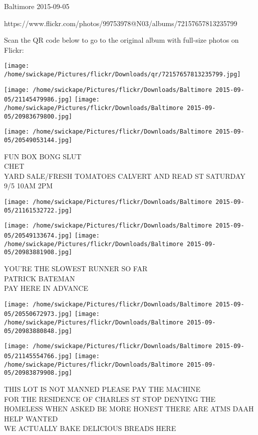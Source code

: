 \documentclass[10pt,letterpaper]{article}
\begin{document}
Baltimore 2015-09-05

https://www.flickr.com/photos/99753978@N03/albums/72157657813235799

Scan the QR code below to go to the original album with full-size photos on Flickr:

\texttt{[image: /home/swickape/Pictures/flickr/Downloads/qr/72157657813235799.jpg]}
\pagebreak

\texttt{[image: /home/swickape/Pictures/flickr/Downloads/Baltimore 2015-09-05/21145479986.jpg]}
\texttt{[image: /home/swickape/Pictures/flickr/Downloads/Baltimore 2015-09-05/20983679800.jpg]}

\texttt{[image: /home/swickape/Pictures/flickr/Downloads/Baltimore 2015-09-05/20549053144.jpg]}

FUN BOX BONG SLUT\\
CHET\\
YARD SALE/FRESH TOMATOES CALVERT AND READ ST SATURDAY 9/5 10AM 2PM
\pagebreak

\texttt{[image: /home/swickape/Pictures/flickr/Downloads/Baltimore 2015-09-05/21161532722.jpg]}

\vspace{0.25in}
\texttt{[image: /home/swickape/Pictures/flickr/Downloads/Baltimore 2015-09-05/20549133674.jpg]}
\texttt{[image: /home/swickape/Pictures/flickr/Downloads/Baltimore 2015-09-05/20983881908.jpg]}

YOU'RE THE SLOWEST RUNNER SO FAR\\
PATRICK BATEMAN\\
PAY HERE IN ADVANCE
\pagebreak

\texttt{[image: /home/swickape/Pictures/flickr/Downloads/Baltimore 2015-09-05/20550672973.jpg]}
\texttt{[image: /home/swickape/Pictures/flickr/Downloads/Baltimore 2015-09-05/20983880848.jpg]}

\texttt{[image: /home/swickape/Pictures/flickr/Downloads/Baltimore 2015-09-05/21145554766.jpg]}
\texttt{[image: /home/swickape/Pictures/flickr/Downloads/Baltimore 2015-09-05/20983879908.jpg]}

THIS LOT IS NOT MANNED PLEASE PAY THE MACHINE\\
FOR THE RESIDENCE OF CHARLES ST STOP DENYING THE HOMELESS WHEN ASKED BE MORE HONEST THERE ARE ATMS DAAH\\
HELP WANTED\\
WE ACTUALLY BAKE DELICIOUS BREADS HERE
\pagebreak
\end{document}
